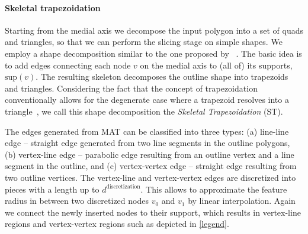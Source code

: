 \paragraph{Skeletal trapezoidation}
Starting from the medial axis we decompose the input polygon into a set of quads and triangles, so that we can perform the slicing stage on simple shapes.
We employ a shape decomposition similar to the one proposed by \citeauthor{Ding2016a}~\cite{Ding2016a}. 
The basic idea is to add edges connecting each node $v$ on the medial axis to (all of) its supports, $\text{sup}(v)$. 
The resulting skeleton decomposes the outline shape into trapezoids and triangles.
Considering the fact that the concept of trapezoidation conventionally allows for the degenerate case where a trapezoid resolves into a triangle~\cite{chazelle1984,fournier1984}, we call this shape decomposition the \emph{Skeletal Trapezoidation} (ST).


The edges generated from MAT can be classified into three types: (a) line-line edge -- straight edge generated from two line segments in the outline polygons, (b) vertex-line edge -- parabolic edge resulting from an outline vertex and a line segment in the outline, and (c) vertex-vertex edge -- straight edge resulting from two outline vertices.
The vertex-line and vertex-vertex edges are discretized into pieces with a length up to $d^\text{discretization}$.
This allows to approximate the feature radius in between two discretized nodes $v_0$ and $v_1$ by linear interpolation. 
Again we connect the newly inserted nodes to their support, which results in vertex-line regions and vertex-vertex regions such as depicted in \cref{legend}.





